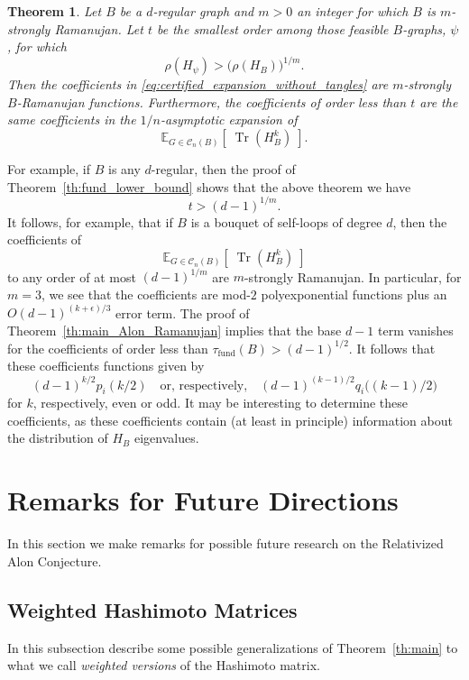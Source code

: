 \documentclass{memo-l}
\theoremstyle{plain}
\newtheorem{theorem}{Theorem}[section]
\theoremstyle{definition}
\numberwithin{section}{chapter}
\numberwithin{equation}{chapter}
\newcommand{\expect}[2]{{\mathbb{E}}_{#1}{\left[\; #2\; \right]}}
\DeclareMathOperator{\Tr}{Tr}
\newcommand{\taufund}{\tau_{\mathrm{fund}}}
\theoremstyle{plain}
\theoremstyle{definition}
\newcommand\cC{\mathcal{C}}
\begin{document}
\begin{theorem}
Let $B$ be a $d$-regular graph and $m>0$ an integer for 
which $B$ is $m$-strongly Ramanujan.  Let $t$ be the smallest order
among those feasible $B$-graphs, $\psi$, for which
$$
\rho(H_\psi) > \bigl( \rho(H_B) \bigr)^{1/m} .
$$
Then the coefficients in
\eqref{eq:certified_expansion_without_tangles} are $m$-strongly
$B$-Ramanujan functions.  Furthermore, the coefficients of order
less than $t$ are the same coefficients in the $1/n$-asymptotic expansion
of
$$
\expect{G \in \cC_n(B)}{\Tr(H_B^k)}.
$$
\end{theorem}

For example, if $B$ is any $d$-regular,
then the proof of Theorem~\ref{th:fund_lower_bound}
shows that the above theorem we have
$$
t> (d-1)^{1/m}.
$$
It follows, for example, that if $B$ is a bouquet of self-loops of degree
$d$, then the coefficients of 
$$
\expect{G \in \cC_n(B)}{\Tr(H_B^k)}
$$
to any order of at most $(d-1)^{1/m}$ are $m$-strongly Ramanujan.
In particular, for $m=3$, we see that the coefficients are mod-$2$ 
polyexponential functions plus an $O(d-1)^{(k+\epsilon)/3}$ error term.
The proof of Theorem~\ref{th:main_Alon_Ramanujan} implies that the
base $d-1$ term vanishes for the coefficients of order less than
$\taufund(B)>(d-1)^{1/2}$.
It follows that these coefficients functions given by
$$
(d-1)^{k/2} p_i(k/2) \quad\mbox{or, respectively,}\quad
(d-1)^{(k-1)/2} q_i\bigl( (k-1)/2\bigr)
$$
for $k$, respectively, even or odd.
It may be interesting to determine these coefficients, as these
coefficients contain (at least in principle) information about the 
distribution of $H_B$ eigenvalues.




% 
\section{Remarks for Future Directions}
\label{se:p2-future}

In this section we make remarks for possible future research on 
the Relativized Alon Conjecture.

\subsection{Weighted Hashimoto Matrices}

In this subsection describe some possible generalizations of
Theorem~\ref{th:main} to what we call {\em weighted versions} of
the Hashimoto matrix.
\end{document}
